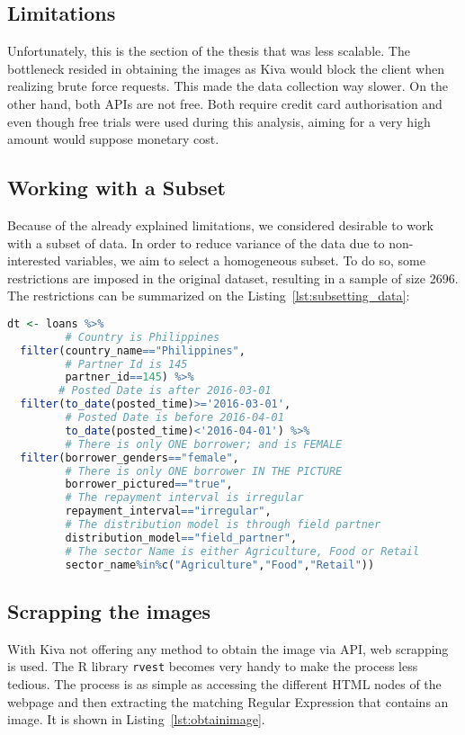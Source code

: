 \subsection{Limitations}
Unfortunately, this is the section of the thesis that was less scalable. The bottleneck resided in obtaining the images as Kiva would block the client when realizing brute force requests. This made the data collection way slower.
On the other hand, both APIs are not free. Both require credit card authorisation and even though free trials were used during this analysis, aiming for a very high amount would suppose monetary cost.

\subsection{Working with a Subset}
Because of the already explained limitations, we considered desirable to work with a subset of data. In order to reduce variance of the data due to non-interested variables, we aim to select a homogeneous subset. To do so, some restrictions are imposed in the original dataset, resulting in a sample of size 2696. The restrictions can be summarized on the Listing~\ref{lst:subsetting_data}:

\begin{lstlisting}[language={R}, frame={single}, label={lst:subsetting_data}, caption={R Code to select a subset}]
dt <- loans %>%
         # Country is Philippines
  filter(country_name=="Philippines", 
         # Partner Id is 145
         partner_id==145) %>%         
        # Posted Date is after 2016-03-01
  filter(to_date(posted_time)>='2016-03-01', 
         # Posted Date is before 2016-04-01
         to_date(posted_time)<'2016-04-01') %>% 
         # There is only ONE borrower; and is FEMALE
  filter(borrower_genders=="female",  
         # There is only ONE borrower IN THE PICTURE
         borrower_pictured=="true",   
         # The repayment interval is irregular
         repayment_interval=="irregular", 
         # The distribution model is through field partner
         distribution_model=="field_partner",
         # The sector Name is either Agriculture, Food or Retail
         sector_name%in%c("Agriculture","Food","Retail")) 
\end{lstlisting}


\subsection{Scrapping the images}
With Kiva not offering any method to obtain the image via API, web scrapping is used. The R library \texttt{rvest} becomes very handy to make the process less tedious.
The process is as simple as accessing the different HTML nodes of the webpage and then extracting the matching Regular Expression that contains an image. It is shown in Listing~\ref{lst:obtainimage}.


